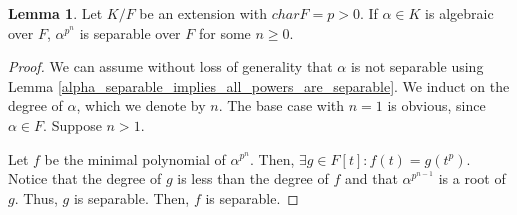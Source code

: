 \documentclass{article}
\theoremstyle{definition}
\newtheorem{lemma}[theorem]{Lemma}
\begin{document}
\begin{lemma}\label{powers_of_elements_are_separable_in_fields_of_char_p}
    Let $K/F$ be an extension with $charF = p > 0$.
    If $\alpha \in K$ is algebraic over $F$, $\alpha^{p^{n}}$ is separable over $F$ for some $n \geq 0$.
\end{lemma}
\begin{proof}
    We can assume without loss of generality that $\alpha$ is not separable
    using Lemma \ref{alpha_separable_implies_all_powers_are_separable}.
    We induct on the degree of $\alpha$, which we denote by $n$. The base case
    with $n = 1$ is obvious, since $\alpha \in F$. Suppose $n > 1$.

    Let $f$ be the minimal polynomial of $\alpha^{p^{n}}$.
    Then, $\exists g \in F[t]: f(t) = g(t^{p})$. Notice that
    the degree of $g$ is less than the degree of $f$ and that $\alpha^{p^{n-1}}$
    is a root of $g$. Thus, $g$ is separable. Then, $f$ is separable.
\end{proof}
\end{document}
